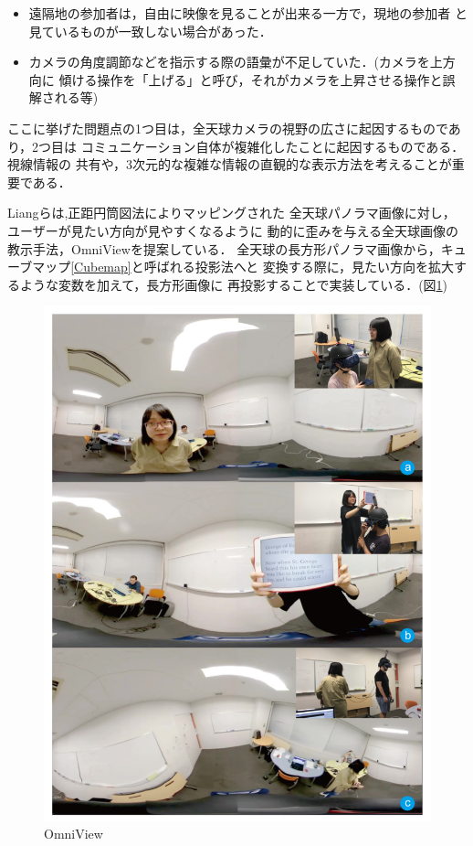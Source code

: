\begin{itemize}
  \item 遠隔地の参加者は，自由に映像を見ることが出来る一方で，現地の参加者
  と見ているものが一致しない場合があった．
  \item カメラの角度調節などを指示する際の語彙が不足していた．(カメラを上方向に
  傾ける操作を「上げる」と呼び，それがカメラを上昇させる操作と誤解される等)
\end{itemize}

ここに挙げた問題点の1つ目は，全天球カメラの視野の広さに起因するものであり，2つ目は
コミュニケーション自体が複雑化したことに起因するものである．視線情報の
共有や，3次元的な複雑な情報の直観的な表示方法を考えることが重要である．

Liangら\cite{31}は,正距円筒図法によりマッピングされた
全天球パノラマ画像に対し，ユーザーが見たい方向が見やすくなるように
動的に歪みを与える全天球画像の教示手法，OmniViewを提案している．
全天球の長方形パノラマ画像から，キューブマップ\cite{32}\ref{Cubemap}と呼ばれる投影法へと
変換する際に，見たい方向を拡大するような変数を加えて，長方形画像に
再投影することで実装している．(図\ref{OmniView})

\begin{figure}[tbp]
  \centering
  \includegraphics[scale=0.7]{fig/OmniView.png}
  \caption{OmniView\cite{31}}\label{OmniView}
\end{figure}

